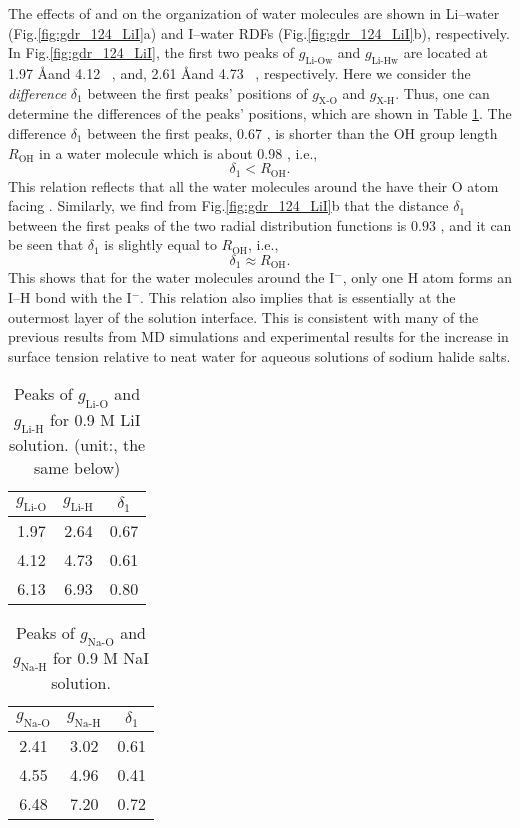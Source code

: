 The effects of \Li and \I on the organization of water molecules are shown in Li--water (Fig.\thinspace\ref{fig:gdr_124_LiI}a) 
and I--water RDFs (Fig.\thinspace\ref{fig:gdr_124_LiI}b), respectively.  
In Fig.\space\ref{fig:gdr_124_LiI}, the first two peaks of $g_{\text{Li-Ow}}$ and $g_{\text{Li-Hw}}$ are located at 1.97 \AA and 4.12 \ \A,  
and, 2.61 \AA and 4.73 \ \A, respectively. 
Here we consider the \emph{difference} $\delta_1$ between the first peaks' positions of $g_{\text{X-O}}$ and $g_{\text{X-H}}$. 
Thus, one can determine the differences of the peaks' positions, which are shown in Table \ref{tab:gdr_Li-water}. 
The difference $\delta_1$ between the first peaks, 0.67 \A, is shorter than the OH group length $R_{\text{OH}}$ in a water molecule which is about 0.98 \A, i.e.,
\begin{equation}
\delta_1 < R_{\text{OH}}.
\label{lt_OH}
\end{equation}
This relation reflects that all the water molecules around the \Li have their O atom facing \li. 
Similarly, we find from Fig.\thinspace\ref{fig:gdr_124_LiI}b that the distance $\delta_1$ between the first peaks of the 
two radial distribution functions is $0.93$ \A, and it can be seen that $\delta_1$ is slightly equal to $R_{\text{OH}}$, i.e., 
\begin{equation}
\delta_1 \approx R_{\text{OH}}.
\label{almost_OH}
\end{equation}
This shows that for the water molecules around the I$^-$, only one H atom forms an I--H bond with the I$^-$. 
This relation also implies that \I is essentially at the outermost layer of the solution interface. 
This is consistent with many of the previous results from MD simulations \cite{Dang2002,Jungwirth2001} 
and experimental results for the increase in surface tension relative to neat water for aqueous solutions of sodium halide salts.\cite{Jungwirth2002,Vrbka2004,Garrett2004,Bajaj2016}
\begin{table}[htbp] %
\centering
\caption{\label{tab:gdr_Li-water} 
Peaks of $g_{\text{Li-O}}$ and $g_{\text{Li-H}}$ for 0.9 M LiI solution. (unit:\A, the same below)}
\begin{tabular}{ccc}
  $g_{\text{Li-O}}$& $g_{\text{Li-H}}$ & $\delta_1$  \\
\hline
 1.97 & 2.64 & 0.67 \\
 4.12&4.73  &0.61  \\
 6.13 &6.93 & 0.80 
\end{tabular}
\end{table}
\begin{table}[htbp] %
  \centering
  \caption{\label{tab:gdr_Na-water} 
  Peaks of $g_{\text{Na-O}}$ and $g_{\text{Na-H}}$ for 0.9 M NaI solution.}
  \begin{tabular}{ccc}
    $g_{\text{Na-O}}$& $g_{\text{Na-H}}$ & $\delta_1$  \\
  \hline
   2.41 & 3.02 & 0.61 \\
   4.55 & 4.96  &0.41  \\
   6.48 & 7.20 & 0.72 
  \end{tabular}
\end{table}
